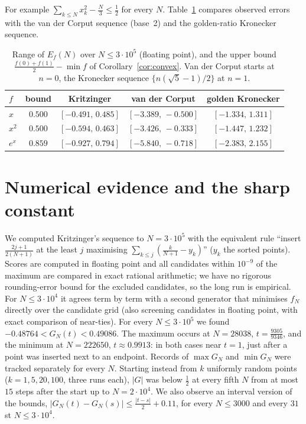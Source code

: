 \documentclass[11pt]{amsart}
\theoremstyle{remark}
\begin{document}
For example $\sum_{k\le N}x_k^2-\frac N3\le\frac12$ for every $N$.
Table~\ref{tab:quad} compares observed errors with the van der Corput sequence
(base~2) and the golden-ratio Kronecker sequence.

\begin{table}[h]
\centering
\begin{tabular}{lcccc}
$f$ & bound & Kritzinger & van der Corput & golden Kronecker\\\hline
$x$ & $0.500$ & $[-0.491,\,0.485]$ & $[-3.389,\,-0.500]$ & $[-1.334,\,1.311]$\\
$x^2$ & $0.500$ & $[-0.594,\,0.463]$ & $[-3.426,\,-0.333]$ & $[-1.447,\,1.232]$\\
$e^x$ & $0.859$ & $[-0.927,\,0.794]$ & $[-5.840,\,-0.718]$ & $[-2.383,\,2.155]$
\end{tabular}
\caption{Range of $E_f(N)$ over $N\le 3\cdot10^5$ (floating point), and the
upper bound $\frac{f(0)+f(1)}{2}-\min f$ of Corollary~\ref{cor:convex}. Van der
Corput starts at $n=0$, the Kronecker sequence $\{n(\sqrt5-1)/2\}$ at $n=1$.}\label{tab:quad}
\end{table}

\section{Numerical evidence and the sharp constant}\label{sec:num}

We computed Kritzinger's sequence to $N=3\cdot10^5$ with the equivalent rule
``insert $\frac{2j+1}{2(N+1)}$ at the least $j$ maximising
$\sum_{k\le j}(\frac{k}{N+1}-y_k)$'' ($y_k$ the sorted points). Scores are
computed in floating point and all candidates within $10^{-9}$ of the maximum
are compared in exact rational arithmetic; we have no rigorous rounding-error
bound for the excluded candidates, so the long run is empirical. For
$N\le3\cdot10^4$ it agrees term by term with a second generator that
minimises $f_N$ directly over the candidate grid (also screening candidates in
floating point, with exact comparison of near-ties).
For every $N\le3\cdot10^5$ we found $-0.48764<G_N(t)<0.49086$. The maximum
occurs at $N=28038$, $t=\frac{9305}{9346}$, and the minimum at $N=222650$,
$t\approx0.9913$: in both cases near $t=1$, just after a point was inserted
next to an endpoint. Records of $\max G_N$ and $\min G_N$ were tracked
separately for every $N$.
Starting instead from $k$ uniformly random points ($k=1,5,20,100$, three runs
each), $|G|$ was below $\frac12$ at every fifth $N$ from at most $15$ steps
after the start up to $N=2\cdot10^4$. We also observe an interval version of the bounds,
$|G_N(t)-G_N(s)|\le\frac{|t-s|}{2}+0.11$, for every $N\le3000$ and every
$31$st $N\le3\cdot10^4$.
\end{document}
